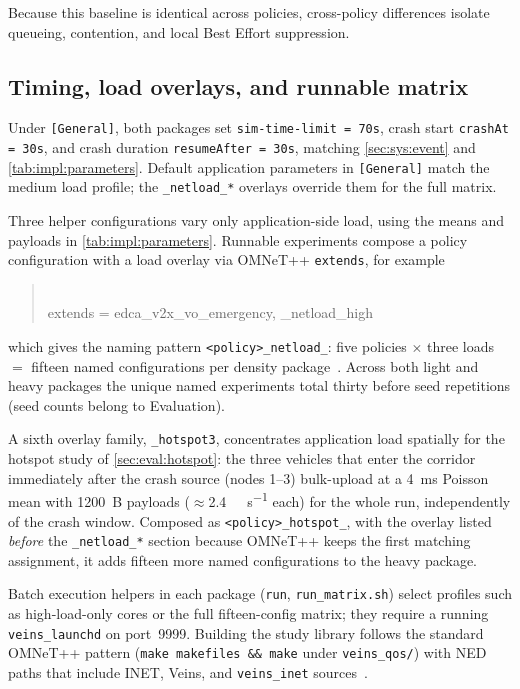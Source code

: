 Because this baseline is identical across policies, cross-policy differences isolate queueing, contention, and local Best Effort suppression.

\subsection{Timing, load overlays, and runnable matrix}
\label{sec:impl:timing}

Under \texttt{[General]}, both packages set \texttt{sim-time-limit = 70s}, crash start \texttt{crashAt = 30s}, and crash duration \texttt{resumeAfter = 30s}, matching \autoref{sec:sys:event} and \autoref{tab:impl:parameters}.
Default application parameters in \texttt{[General]} match the medium load profile; the \texttt{\_netload\_*} overlays override them for the full matrix.

\label{sec:impl:matrix}

Three helper configurations vary only application-side load, using the means and payloads in \autoref{tab:impl:parameters}.
Runnable experiments compose a policy configuration with a load overlay via OMNeT++ \texttt{extends}, for example

\begin{quote}
\\
extends = edca\_v2x\_vo\_emergency, \_netload\_high
\end{quote}

which gives the naming pattern \texttt{<policy>\_netload\_<low|medium|high>}: five policies $\times$ three loads $=$ fifteen named configurations per density package~\cite{aguiar2026_veins_qos}.
Across both light and heavy packages the unique named experiments total thirty before seed repetitions (seed counts belong to Evaluation).

A sixth overlay family, \texttt{\_hotspot3}, concentrates application load spatially for the hotspot study of \autoref{sec:eval:hotspot}: the three vehicles that enter the corridor immediately after the crash source (nodes 1--3) bulk-upload at a \SI{4}{\milli\second} Poisson mean with 1200~B payloads (\(\approx\)\SI{2.4}{\mega\bit\per\second} each) for the whole run, independently of the crash window.
Composed as \texttt{<policy>\_hotspot\_<low|medium|high>}, with the overlay listed \emph{before} the \texttt{\_netload\_*} section because OMNeT++ keeps the first matching assignment, it adds fifteen more named configurations to the heavy package.

Batch execution helpers in each package (\texttt{run}, \texttt{run\_matrix.sh}) select profiles such as high-load-only cores or the full fifteen-config matrix; they require a running \texttt{veins\_launchd} on port~9999.
Building the study library follows the standard OMNeT++ pattern (\texttt{make makefiles \&\& make} under \texttt{veins\_qos/}) with NED paths that include INET, Veins, and \texttt{veins\_inet} sources~\cite{aguiar2026_veins_qos}.


